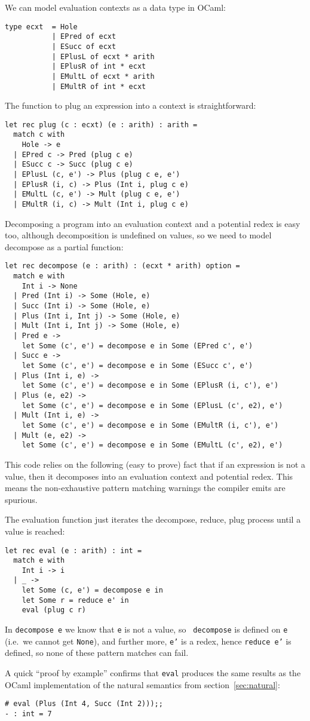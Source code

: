 We can model evaluation contexts as a data type in OCaml:
\begin{verbatim}
type ecxt  = Hole
           | EPred of ecxt
           | ESucc of ecxt
           | EPlusL of ecxt * arith
           | EPlusR of int * ecxt
           | EMultL of ecxt * arith
           | EMultR of int * ecxt
\end{verbatim}
The function to plug an expression into a context is straightforward:
\begin{verbatim}
let rec plug (c : ecxt) (e : arith) : arith =
  match c with
    Hole -> e
  | EPred c -> Pred (plug c e)
  | ESucc c -> Succ (plug c e)
  | EPlusL (c, e') -> Plus (plug c e, e')
  | EPlusR (i, c) -> Plus (Int i, plug c e)
  | EMultL (c, e') -> Mult (plug c e, e')
  | EMultR (i, c) -> Mult (Int i, plug c e)
\end{verbatim}
Decomposing a program into an evaluation context and a potential redex
is easy too, although decomposition is undefined on values, so we
need to model decompose as a partial function:
\begin{verbatim}
let rec decompose (e : arith) : (ecxt * arith) option =
  match e with
    Int i -> None
  | Pred (Int i) -> Some (Hole, e)
  | Succ (Int i) -> Some (Hole, e)
  | Plus (Int i, Int j) -> Some (Hole, e)
  | Mult (Int i, Int j) -> Some (Hole, e)
  | Pred e -> 
    let Some (c', e') = decompose e in Some (EPred c', e')
  | Succ e -> 
    let Some (c', e') = decompose e in Some (ESucc c', e')
  | Plus (Int i, e) -> 
    let Some (c', e') = decompose e in Some (EPlusR (i, c'), e')
  | Plus (e, e2) ->
    let Some (c', e') = decompose e in Some (EPlusL (c', e2), e')
  | Mult (Int i, e) -> 
    let Some (c', e') = decompose e in Some (EMultR (i, c'), e')
  | Mult (e, e2) -> 
    let Some (c', e') = decompose e in Some (EMultL (c', e2), e')
\end{verbatim}
This code relies on the following (easy to prove) fact that if an
expression is not a value, then it decomposes into an evaluation
context and potential redex.  This means the non-exhaustive pattern
matching warnings the compiler emits are spurious.

The evaluation function just iterates the decompose, reduce, plug
process until a value is reached:
\begin{verbatim}
let rec eval (e : arith) : int =
  match e with
    Int i -> i
  | _ -> 
    let Some (c, e') = decompose e in
    let Some r = reduce e' in
    eval (plug c r)
\end{verbatim}
In {\tt decompose e} we know that {\tt e} is not a value, so {\tt
  decompose} is defined on {\tt e} (i.e.~we cannot get {\tt None}),
and further more, {\tt e'} is a redex, hence {\tt reduce e'} is
defined, so none of these pattern matches can fail.

A quick ``proof by example'' confirms that {\tt eval} produces the
same results as the OCaml implementation of the natural semantics from
section~\ref{sec:natural}:
\begin{verbatim}
# eval (Plus (Int 4, Succ (Int 2)));;
- : int = 7
\end{verbatim}


